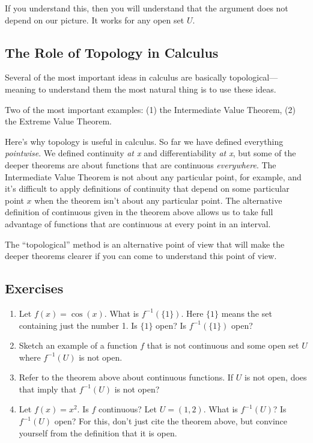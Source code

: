 \documentclass[11pt]{book}
\numberwithin{example}{chapter}
\begin{document}
If you understand this, then you will understand that the argument does not depend on our picture.  It works for any open set $U$.  


\subsection{The Role of Topology in Calculus}

Several of the most important ideas in calculus are basically topological---meaning to understand them the most natural thing is to use these ideas.  

Two of the most important examples: (1) the Intermediate Value Theorem, (2) the Extreme Value Theorem.


Here's why topology is useful in calculus.  So far we have defined everything \emph{pointwise}.  We defined continuity \emph{at x} and differentiability \emph{at x}, but some of the deeper theorems are about functions that are continuous \emph{everywhere}.  The Intermediate Value Theorem is not about any particular point, for example, and it's difficult to apply definitions of continuity that depend on some particular point $x$ when the theorem isn't about any particular point.  The alternative definition of continuous given in the theorem above allows us to take full advantage of functions that are continuous at every point in an interval.  

The ``topological'' method is an alternative point of view that will make the deeper theorems clearer if you can come to understand this point of view.  



\subsection{Exercises}

\begin{enumerate}
\item
Let $f(x)=\cos(x)$.  What is $f^{-1}(\{1\})$.  Here $\{1\}$ means the set containing just the number 1. Is $\{1\}$ open?  Is $f^{-1}(\{1\})$ open?




\item
Sketch an example of a function $f$ that is not continuous and some open set $U$ where $f^{-1}(U)$ is not open.  

\item
Refer to the theorem above about continuous functions.  If $U$ is not open, does that imply that $f^{-1}(U)$ is not open?

\item
Let $f(x)=x^2$.  Is $f$ continuous?  Let $U=(1,2)$. What is $f^{-1}(U)$?  Is $f^{-1}(U)$ open?  For this, don't just cite the theorem above, but convince yourself from the definition that it is open.



\end{enumerate}
\end{document}
